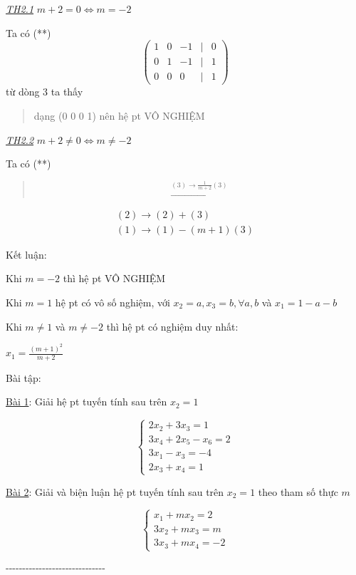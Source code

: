 \documentclass[12pt,a4paper]{article}
\let\ul\uline
\begin{document}
\emph{\ul{TH2.1}} $m + 2 = 0 \Leftrightarrow m = -2$

Ta có (**)$$\begin{pmatrix} 1 & 0 & -1 & | & 0 \\ 0 & 1 & -1 & | & 1 \\ 0 & 0 & 0 & | & 1 \end{pmatrix}$$ từ dòng 3 ta thấy

\begin{quote}
dạng (0 0 0 \textbar{} 1) nên hệ pt VÔ NGHIỆM
\end{quote}

\emph{\ul{TH2.2}} $m + 2 \neq 0 \Leftrightarrow m \neq -2$

Ta có (**)

\begin{quote}
$$\xrightarrow{(3) \rightarrow \frac{1}{m+2}(3)}$$
\end{quote}

$$\begin{matrix} (2) \rightarrow (2) + (3) \\ (1) \rightarrow (1) - (m+1)(3) \end{matrix}$$

Kết luận:

Khi $m = -2$ thì hệ pt VÔ NGHIỆM

Khi $m = 1$ hệ pt có vô số nghiệm, với
$x_2 = a, x_3 = b, \forall a, b$ và
$x_1 = 1 - a - b$

Khi $m \neq 1$ và
$m \neq -2$ thì hệ pt có nghiệm duy nhất:

$x_1 = \frac{(m+1)^2}{m+2}$

Bài tập:

\ul{Bài 1}: Giải hệ pt tuyến tính sau trên
$x_2 = 1$

$$\begin{cases} 2x_2 + 3x_3 = 1 \\ 3x_4 + 2x_5 - x_6 = 2 \\ 3x_1 - x_3 = -4 \\ 2x_3 + x_4 = 1 \end{cases}$$

\ul{Bài 2}: Giải và biện luận hệ pt tuyến tính sau trên
$x_2 = 1$ theo tham số thực
$m$

$$\begin{cases} x_1 + mx_2 = 2 \\ 3x_2 + mx_3 = m \\ 3x_3 + mx_4 = -2 \end{cases}$$

-\/-\/-\/-\/-\/-\/-\/-\/-\/-\/-\/-\/-\/-\/-\/-\/-\/-\/-\/-\/-\/-\/-\/-\/-\/-\/-\/-\/-\/-
\end{document}
